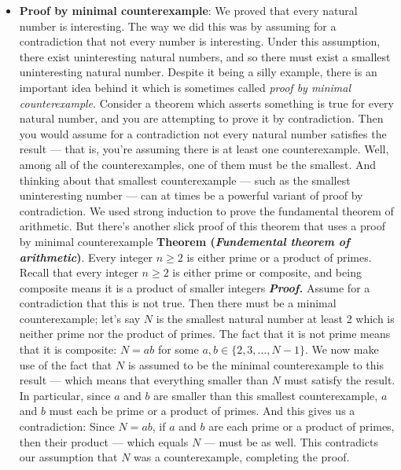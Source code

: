 \documentclass{report}
\begin{document}
\begin{itemize}
        \item \textbf{Proof by minimal counterexample}: We proved that every natural number is interesting. The way we did this was by assuming for a contradiction that not every number is interesting. Under this assumption, there exist uninteresting natural numbers, and so there must exist a smallest uninteresting natural number.
            \bigbreak \noindent 
            Despite it being a silly example, there is an important idea behind it which is sometimes called \textit{proof by minimal counterexample}. Consider a theorem which asserts something is true for every natural number, and you are attempting to prove it by contradiction. Then you would assume for a contradiction not every natural number satisfies the result — that is, you’re assuming there is at least one counterexample. Well, among all of the counterexamples, one of them must be the smallest. And thinking about that smallest counterexample — such as the smallest uninteresting number — can at times be a powerful variant of proof by contradiction.
            \bigbreak \noindent 
            We used strong induction to prove the fundamental theorem of arithmetic. But there’s another slick proof of this theorem that uses a proof by minimal counterexample
            \bigbreak \noindent 
            \textbf{Theorem (\textit{Fundemental theorem of arithmetic})}. Every integer $n \geq 2 $ is either prime or a product of primes.
            \bigbreak \noindent 
            Recall that every integer $n \geq 2$ is either prime or composite, and being composite means it is a product of smaller integers
            \bigbreak \noindent 
            \textbf{\textit{Proof.}} 
            Assume for a contradiction that this is not true. Then there must be a minimal counterexample; let’s say $N$ is the smallest natural number at least 2 which is neither prime nor the product of primes. The fact that it is not prime means that it is composite: $N = ab$ for some $a, b \in \{2, 3, \ldots, N - 1\}$.
            \bigbreak \noindent 
            We now make use of the fact that $N$ is assumed to be the minimal counterexample to this result — which means that everything smaller than $N$ must satisfy the result. In particular, since $a$ and $b$ are smaller than this smallest counterexample, $a$ and $b$ must each be prime or a product of primes.
            \bigbreak \noindent 
            And this gives us a contradiction: Since $N = ab$, if $a$ and $b$ are each prime or a product of primes, then their product — which equals $N$ — must be as well. This contradicts our assumption that $N$ was a counterexample, completing the proof.

\end{itemize}
\end{document}
